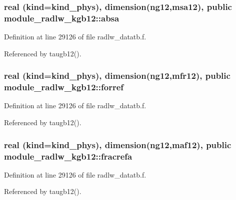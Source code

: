 \subsubsection[{\texorpdfstring{absa}{absa}}]{\setlength{\rightskip}{0pt plus 5cm}real (kind=kind\+\_\+phys), dimension(ng12,{\bf msa12}), public module\+\_\+radlw\+\_\+kgb12\+::absa}\hypertarget{namespacemodule__radlw__kgb12_a7600bfa19dde3b47d8479f5766ee0c93}{}\label{namespacemodule__radlw__kgb12_a7600bfa19dde3b47d8479f5766ee0c93}


Definition at line 29126 of file radlw\+\_\+datatb.\+f.



Referenced by taugb12().

\subsubsection[{\texorpdfstring{forref}{forref}}]{\setlength{\rightskip}{0pt plus 5cm}real (kind=kind\+\_\+phys), dimension(ng12,{\bf mfr12}), public module\+\_\+radlw\+\_\+kgb12\+::forref}\hypertarget{namespacemodule__radlw__kgb12_a97dac0d0e010441171e09e317e5aeee8}{}\label{namespacemodule__radlw__kgb12_a97dac0d0e010441171e09e317e5aeee8}


Definition at line 29126 of file radlw\+\_\+datatb.\+f.



Referenced by taugb12().

\subsubsection[{\texorpdfstring{fracrefa}{fracrefa}}]{\setlength{\rightskip}{0pt plus 5cm}real (kind=kind\+\_\+phys), dimension(ng12,{\bf maf12}), public module\+\_\+radlw\+\_\+kgb12\+::fracrefa}\hypertarget{namespacemodule__radlw__kgb12_a58ff4f54c11eb12f7ab5157823981b16}{}\label{namespacemodule__radlw__kgb12_a58ff4f54c11eb12f7ab5157823981b16}


Definition at line 29126 of file radlw\+\_\+datatb.\+f.



Referenced by taugb12().

